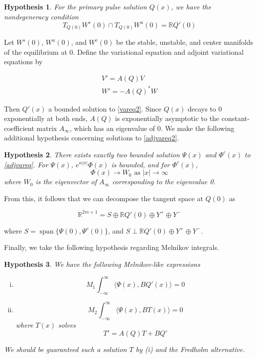 \documentclass[12pt]{article}
\def\R{{\mathbb R}}
\DeclareMathOperator{\spn}{span}
\newtheorem{hypothesis}{Hypothesis}
\begin{document}
\begin{hypothesis}\label{nondegen}
For the primary pulse solution $Q(x)$, we have the nondegeneracy condition
\begin{equation}
T_{Q(0)}W^s(0) \cap T_{Q(0)}W^u(0) = \R Q'(0)
\end{equation}
\end{hypothesis}

Let $W^s(0)$, $W^u(0)$, and $W^c(0)$ be the stable, unstable, and center manifolds of the equilibrium at 0. Define the variational equation and adjoint variational equations by

\begin{align}
V' = A(Q) V \label{vareq2} \\
W' = -A(Q)^* W \label{adjvareq2}
\end{align}

Then $Q'(x)$ a bounded solution to \eqref{vareq2}. Since $Q(x)$ decays to 0 exponentially at both ends, $A(Q)$ is exponentially asymptotic to the constant-coefficient matrix $A_\infty$, which has an eigenvalue of 0. We make the following additional hypothesis concerning solutions to \eqref{adjvareq2}.

\begin{hypothesis}\label{adjsolutions}
There exists exactly two bounded solution $\Psi(x)$ and $\Phi^c(x)$ to \eqref{adjvareq}. For $\Psi(x)$, $e^{\alpha |x|}\Phi(x)$ is bounded, and for $\Phi^c(x)$,
\begin{equation}
\Phi(x) \rightarrow W_0 \text{ as }|x| \rightarrow \infty
\end{equation}
where $W_0$ is the eigenvector of $A_\infty$ corresponding to the eigenvalue 0.
\end{hypothesis}

From this, it follows that we can decompose the tangent space at $Q(0)$ as 

\begin{equation}
\R^{2m+1} = S \oplus \R Q'(0) \oplus Y^+ \oplus Y^-
\end{equation}

where $S = \spn\{ \Psi(0), \Psi^c(0) \}$, and $S \perp \R Q'(0) \oplus Y^+ \oplus Y^-$.

Finally, we take the following hypothesis regarding Melnikov integrals.

\begin{hypothesis}\label{Melnikov2}
We have the following Melnikov-like expressions
\begin{enumerate}[(i)]
\item 
\begin{equation}
M_1 \int_{-\infty}^\infty \langle \Psi(x), B Q'(x) \rangle = 0
\end{equation}
\item 
\begin{equation}
M_2 \int_{-\infty}^\infty \langle \Psi(x), B T(x) \rangle = 0
\end{equation}
where $T(x)$ solves 
\begin{equation}
T' = A(Q)T + BQ'
\end{equation}
\end{enumerate}
We should be guaranteed such a solution $T$ by (i) and the Fredholm alternative.
\end{hypothesis}
\end{document}

